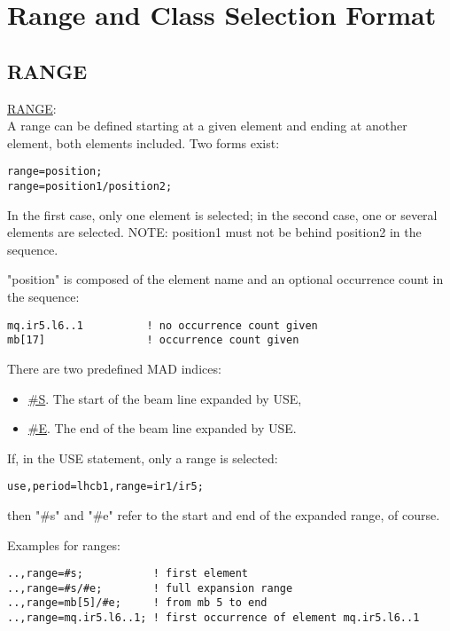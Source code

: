 
\chapter{Range and Class Selection Format}

\section{RANGE}
\label{sec:range}

 \href{range}{RANGE}: \\
A range can be defined starting at  a given element and ending at
another element, both elements included. Two forms exist:  

\begin{verbatim}
range=position;
range=position1/position2;
\end{verbatim} 

In the first case, only one element is selected; in the second case, one
or several elements are selected. NOTE: position1 must not be behind
position2 in the sequence.  

"position" is composed of the element name and an optional occurrence count in the sequence: 
\label{range_position}
\begin{verbatim}
mq.ir5.l6..1          ! no occurrence count given
mb[17]                ! occurrence count given
\end{verbatim} 

There are two predefined MAD indices: 
\begin{itemize}
   \item \href{s}{\#S}. The start of the beam line expanded by USE, 
   \item \href{e}{\#E}. The end of the beam line expanded by USE. 
\end{itemize} 

If, in the USE statement, only a range is selected: 
\begin{verbatim}
use,period=lhcb1,range=ir1/ir5;
\end{verbatim} 
then "\#s" and "\#e" refer to the start and end of the expanded range, of course. 

 Examples for ranges: 
\begin{verbatim}
..,range=#s;           ! first element
..,range=#s/#e;        ! full expansion range
..,range=mb[5]/#e;     ! from mb 5 to end
..,range=mq.ir5.l6..1; ! first occurrence of element mq.ir5.l6..1
\end{verbatim}

